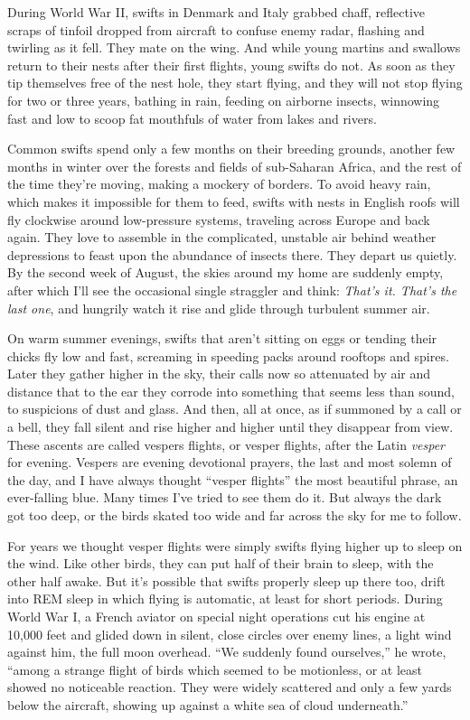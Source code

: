 During World War II, swifts in Denmark and Italy grabbed chaff,
reflective scraps of tinfoil dropped from aircraft to confuse enemy
radar, flashing and twirling as it fell. They mate on the wing. And
while young martins and swallows return to their nests after their first
flights, young swifts do not. As soon as they tip themselves free of the
nest hole, they start flying, and they will not stop flying for two or
three years, bathing in rain, feeding on airborne insects, winnowing
fast and low to scoop fat mouthfuls of water from lakes and rivers.

Common swifts spend only a few months on their breeding grounds, another
few months in winter over the forests and fields of sub-Saharan Africa,
and the rest of the time they're moving, making a mockery of borders. To
avoid heavy rain, which makes it impossible for them to feed, swifts
with nests in English roofs will fly clockwise around low-pressure
systems, traveling across Europe and back again. They love to assemble
in the complicated, unstable air behind weather depressions to feast
upon the abundance of insects there. They depart us quietly. By the
second week of August, the skies around my home are suddenly empty,
after which I'll see the occasional single straggler and think:
\emph{That's it. That's the last one}, and hungrily watch it rise and
glide through turbulent summer air.

On warm summer evenings, swifts that aren't sitting on eggs or tending
their chicks fly low and fast, screaming in speeding packs around
rooftops and spires. Later they gather higher in the sky, their calls
now so attenuated by air and distance that to the ear they corrode into
something that seems less than sound, to suspicions of dust and glass.
And then, all at once, as if summoned by a call or a bell, they fall
silent and rise higher and higher until they disappear from view. These
ascents are called vespers flights, or vesper flights, after the Latin
\emph{vesper} for evening. Vespers are evening devotional prayers, the
last and most solemn of the day, and I have always thought ``vesper
flights'' the most beautiful phrase, an ever-falling blue. Many times
I've tried to see them do it. But always the dark got too deep, or the
birds skated too wide and far across the sky for me to follow.

For years we thought vesper flights were simply swifts flying higher up
to sleep on the wind. Like other birds, they can put half of their brain
to sleep, with the other half awake. But it's possible that swifts
properly sleep up there too, drift into REM sleep in which flying is
automatic, at least for short periods. During World War I, a French
aviator on special night operations cut his engine at 10,000 feet and
glided down in silent, close circles over enemy lines, a light wind
against him, the full moon overhead. ``We suddenly found ourselves,'' he
wrote, ``among a strange flight of birds which seemed to be motionless,
or at least showed no noticeable reaction. They were widely scattered
and only a few yards below the aircraft, showing up against a white sea
of cloud underneath.''

